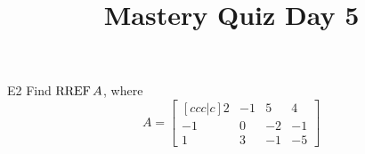 \documentclass{sbgLAquiz}
\title{Mastery Quiz Day 5 }
\begin{document}
\begin{problem}{E2}
Find \(\operatorname{RREF} A\), where
\[
  A =
  \begin{bmatrix}[ccc|c]
    2 & -1 & 5 & 4 \\
    -1 & 0 & -2 & -1 \\
    1 & 3 & -1 & -5
  \end{bmatrix}
\]
\end{problem}
\end{document}
